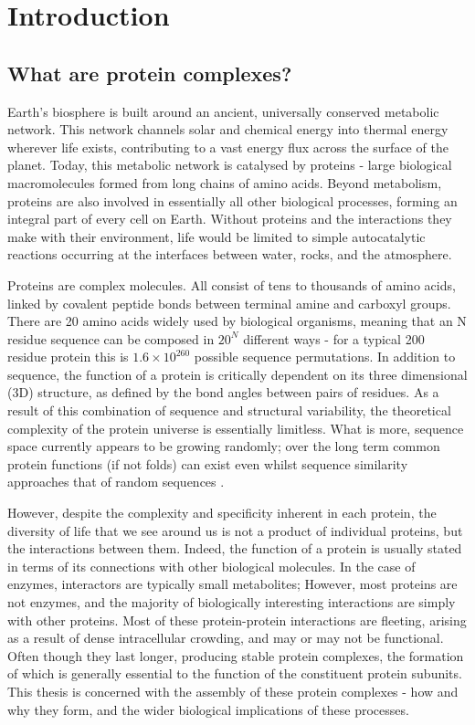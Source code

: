 \documentclass[a4paper,11pt,twoside,openright]{scrbook}
\begin{document}
\chapter{Introduction} \label{chapter:intro}

\section{What are protein complexes?}
Earth's biosphere is built around an ancient, universally conserved metabolic network. This network channels solar and chemical energy into thermal energy wherever life exists, contributing to a vast energy flux across the surface of the planet. Today, this metabolic network is catalysed by proteins - large biological macromolecules formed from long chains of amino acids. Beyond metabolism, proteins are also involved in essentially all other biological processes, forming an integral part of every cell on Earth. Without proteins and the interactions they make with their environment, life would be limited to simple autocatalytic reactions occurring at the interfaces between water, rocks, and the atmosphere.

Proteins are complex molecules. All consist of tens to thousands of amino acids, linked by covalent peptide bonds between terminal amine and carboxyl groups. There are 20 amino acids widely used by biological organisms, meaning that an N residue sequence can be composed in \(20^{N}\) different ways - for a typical 200 residue protein this is \(1.6 \times 10^{260}\) possible sequence permutations. In addition to sequence, the function of a protein is critically dependent on its three dimensional (3D) structure, as defined by the bond angles between pairs of residues. As a result of this combination of sequence and structural variability, the theoretical complexity of the protein universe is essentially limitless. What is more, sequence space currently appears to be growing randomly; over the long term common protein functions (if not folds) can exist even whilst sequence similarity approaches that of random sequences \cite{Larson2002,Povolotskaya2010}.

However, despite the complexity and specificity inherent in each protein, the diversity of life that we see around us is not a product of individual proteins, but the interactions between  them. Indeed, the function of a protein is usually stated in terms of its connections with other biological molecules. In the case of enzymes, interactors are typically small metabolites; However, most proteins are not enzymes, and the majority of biologically interesting interactions are simply with other proteins. Most of these protein-protein interactions are fleeting, arising as a result of dense intracellular crowding, and may or may not be functional. Often though they last longer, producing stable protein complexes, the formation of which is generally essential to the function of the constituent protein subunits. This thesis is concerned with the assembly of these protein complexes - how and why they form, and the wider biological implications of these processes.
\end{document}
